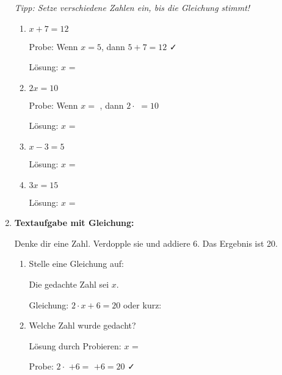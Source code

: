 \begin{enumerate}[resume, label=\arabic*.]
    \textit{Tipp: Setze verschiedene Zahlen ein, bis die Gleichung stimmt!}

    \begin{enumerate}[label=\alph*)]
        \item $x + 7 = 12$ 

        Probe: Wenn $x = 5$, dann $5 + 7 = 12$ ✓

        Lösung: $x$ = \underline{\hspace{2cm}}

        \item $2x = 10$ 

        Probe: Wenn $x = $ \underline{\hspace{1cm}}, dann $2 \cdot$ \underline{\hspace{1cm}} $= 10$

        Lösung: $x$ = \underline{\hspace{2cm}}

        \item $x - 3 = 5$ 

        Lösung: $x$ = \underline{\hspace{2cm}}

        \item $3x = 15$ 

        Lösung: $x$ = \underline{\hspace{2cm}}
    \end{enumerate}

    \vspace{0.5cm}

    \item \textbf{Textaufgabe mit Gleichung:}

    Denke dir eine Zahl. Verdopple sie und addiere 6. Das Ergebnis ist 20.

    \begin{enumerate}[label=\alph*)]
        \item Stelle eine Gleichung auf: 

        Die gedachte Zahl sei $x$.

        Gleichung: $2 \cdot x + 6 = 20$ oder kurz: \underline{\hspace{4cm}}

        \item Welche Zahl wurde gedacht? 

        Lösung durch Probieren: $x$ = \underline{\hspace{2cm}}

        Probe: $2 \cdot$ \underline{\hspace{1cm}} $+ 6 = $ \underline{\hspace{1cm}} $+ 6 = 20$ ✓
    \end{enumerate}
\end{enumerate}